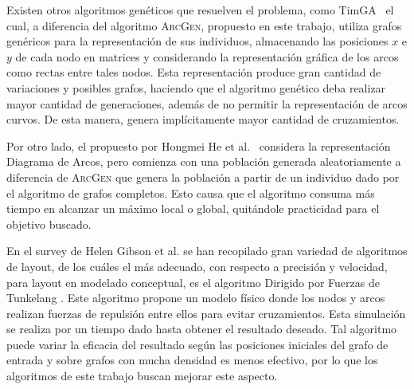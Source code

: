 	Existen otros  algoritmos genéticos que resuelven el problema, como  TimGA \cite{eloranta2001timga}\ el cual, a diferencia del algoritmo \textsc{ArcGen}, propuesto en este trabajo, utiliza grafos genéricos para la representación de sus individuos, almacenando las posiciones $x$ e $y$ de cada nodo en matrices y considerando la representación gráfica de los arcos como rectas entre tales nodos. Esta representación produce gran cantidad de variaciones y posibles grafos, haciendo que el algoritmo genético deba realizar mayor cantidad de generaciones, además de no permitir la representación de arcos curvos. De esta manera, genera implícitamente mayor cantidad de cruzamientos. 
	
	Por otro lado, el propuesto por Hongmei He et al. \cite{he2007parallelisation}\ considera la representación  Diagrama de Arcos, pero comienza con una población generada aleatoriamente a diferencia de \textsc{ArcGen} que genera la población a partir de un individuo dado por el algoritmo de grafos completos. Esto causa que el algoritmo consuma más tiempo en alcanzar un máximo local o global, quitándole practicidad para el objetivo buscado.
	
	En el survey de Helen Gibson et al. \cite{gibson2013survey} se han recopilado gran variedad de algoritmos de layout, de los cuáles el más adecuado, con respecto a precisión y velocidad, para layout en modelado conceptual, es el algoritmo Dirigido por Fuerzas de Tunkelang \cite{tunkelang1998jiggle}. Este algoritmo  propone un modelo físico donde los nodos y arcos realizan fuerzas de repulsión entre ellos para evitar cruzamientos. Esta simulación se realiza por un tiempo dado hasta obtener el resultado deseado. Tal algoritmo puede variar la eficacia del resultado según las posiciones iniciales del grafo de entrada y sobre grafos con mucha densidad es menos efectivo, por lo que los algoritmos de este trabajo buscan mejorar este aspecto. %
	

